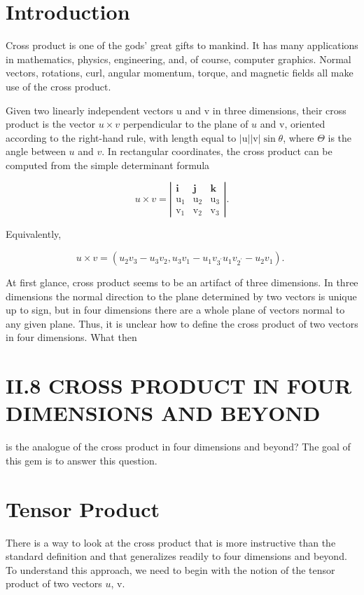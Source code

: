 \begin{CJK}{UTF8}{gbsn}
\section{Introduction}
Cross product is one of the gods' great gifts to mankind. It has many applications in mathematics, physics, engineering, and, of course, computer graphics. Normal vectors, rotations, curl, angular momentum, torque, and magnetic fields all make use of the cross product.

Given two linearly independent vectors $\mathrm{u}$ and $\mathrm{v}$ in three dimensions, their cross product is the vector $u \times v$ perpendicular to the plane of $u$ and $\mathrm{v}$, oriented according to the right-hand rule, with length equal to $|\mathrm{u}||\mathrm{v}| \sin \theta$, where $\Theta$ is the angle between $u$ and $v$. In rectangular coordinates, the cross product can be computed from the simple determinant formula

$$
u \times v=\left|\begin{array}{ccc}
\mathbf{i} & \mathbf{j} & \mathbf{k} \\
\mathrm{u}_{1} & \mathrm{u}_{2} & \mathrm{u}_{3} \\
\mathrm{v}_{1} & \mathrm{v}_{2} & \mathrm{v}_{3}
\end{array}\right| .
$$

Equivalently,

$$
u \times v=\left(u_{2} v_{3}-u_{3} v_{2}, u_{3} v_{1}-u_{1} v_{3^{\prime}} u_{1} v_{2^{\prime}}-u_{2} v_{1}\right) \text {. }
$$

At first glance, cross product seems to be an artifact of three dimensions. In three dimensions the normal direction to the plane determined by two vectors is unique up to sign, but in four dimensions there are a whole plane of vectors normal to any given plane. Thus, it is unclear how to define the cross product of two vectors in four dimensions. What then

\section{II.8 CROSS PRODUCT IN FOUR DIMENSIONS AND BEYOND}
is the analogue of the cross product in four dimensions and beyond? The goal of this gem is to answer this question.

\section{Tensor Product}
There is a way to look at the cross product that is more instructive than the standard definition and that generalizes readily to four dimensions and beyond. To understand this approach, we need to begin with the notion of the tensor product of two vectors $u$, v.


\end{CJK}
